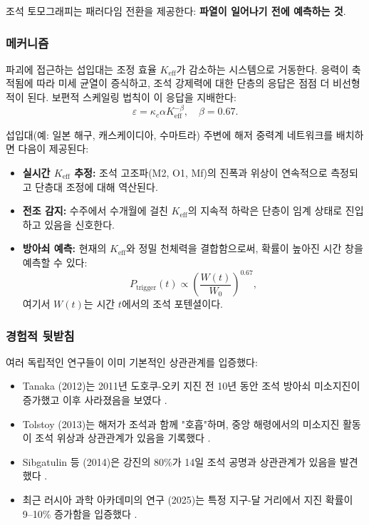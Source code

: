 \documentclass[12pt,a4paper]{article}
\theoremstyle{remark}
\begin{document}
	조석 토모그래피는 패러다임 전환을 제공한다: \textbf{파열이 일어나기 전에 예측하는 것}.
	
	\subsubsection{메커니즘}
	
	파괴에 접근하는 섭입대는 조정 효율 \(K_{\mathrm{eff}}\)가 감소하는 시스템으로 거동한다. 응력이 축적됨에 따라 미세 균열이 증식하고, 조석 강제력에 대한 단층의 응답은 점점 더 비선형적이 된다. 보편적 스케일링 법칙이 이 응답을 지배한다:
	\[
	\varepsilon = \kappa_c \alpha K_{\mathrm{eff}}^{-\beta}, \quad \beta = 0.67.
	\]
	
	섭입대(예: 일본 해구, 캐스케이디아, 수마트라) 주변에 해저 중력계 네트워크를 배치하면 다음이 제공된다:
	\begin{itemize}
		\item \textbf{실시간 \(K_{\mathrm{eff}}\) 추정:} 조석 고조파(M2, O1, Mf)의 진폭과 위상이 연속적으로 측정되고 단층대 조정에 대해 역산된다.
		\item \textbf{전조 감지:} 수주에서 수개월에 걸친 \(K_{\mathrm{eff}}\)의 지속적 하락은 단층이 임계 상태로 진입하고 있음을 신호한다.
		\item \textbf{방아쇠 예측:} 현재의 \(K_{\mathrm{eff}}\)와 정밀 천체력을 결합함으로써, 확률이 높아진 시간 창을 예측할 수 있다:
		\[
		P_{\text{trigger}}(t) \propto \left( \frac{W(t)}{W_0} \right)^{0.67},
		\]
		여기서 \(W(t)\)는 시간 \(t\)에서의 조석 포텐셜이다.
	\end{itemize}
	
	\subsubsection{경험적 뒷받침}
	
	여러 독립적인 연구들이 이미 기본적인 상관관계를 입증했다:
	\begin{itemize}
		\item Tanaka (2012)는 2011년 도호쿠-오키 지진 전 10년 동안 조석 방아쇠 미소지진이 증가했고 이후 사라졌음을 보였다 \cite{Tanaka2012}.
		\item Tolstoy (2013)는 해저가 조석과 함께 "호흡"하며, 중앙 해령에서의 미소지진 활동이 조석 위상과 상관관계가 있음을 기록했다 \cite{Tolstoy2013}.
		\item Sibgatulin 등 (2014)은 강진의 80\%가 14일 조석 공명과 상관관계가 있음을 발견했다 \cite{Sibgatulin2014}.
		\item 최근 러시아 과학 아카데미의 연구 (2025)는 특정 지구-달 거리에서 지진 확률이 9–10\% 증가함을 입증했다 \cite{RAN2025}.
	\end{itemize}
	
\end{document}
